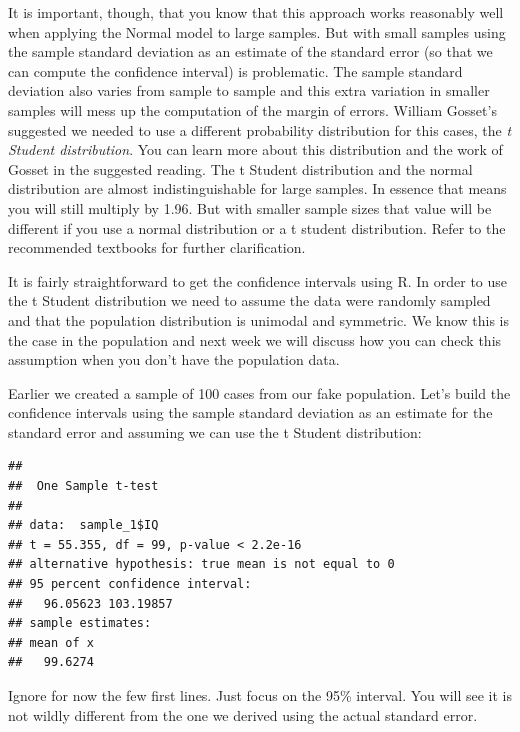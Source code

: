 \documentclass[]{book}
\newenvironment{Shaded}{\begin{snugshade}}{\end{snugshade}}
\newcommand{\DecValTok}[1]{\textcolor[rgb]{0.00,0.00,0.81}{#1}}
\newcommand{\KeywordTok}[1]{\textcolor[rgb]{0.13,0.29,0.53}{\textbf{#1}}}
\newcommand{\NormalTok}[1]{#1}
\newcommand{\OperatorTok}[1]{\textcolor[rgb]{0.81,0.36,0.00}{\textbf{#1}}}
\theoremstyle{definition}
\theoremstyle{definition}
\theoremstyle{definition}
\theoremstyle{remark}
\begin{document}
It is important, though, that you know that this approach works
reasonably well when applying the Normal model to large samples. But
with small samples using the sample standard deviation as an estimate of
the standard error (so that we can compute the confidence interval) is
problematic. The sample standard deviation also varies from sample to
sample and this extra variation in smaller samples will mess up the
computation of the margin of errors. William Gosset's suggested we
needed to use a different probability distribution for this cases, the
\emph{t Student distribution}. You can learn more about this
distribution and the work of Gosset in the suggested reading. The t
Student distribution and the normal distribution are almost
indistinguishable for large samples. In essence that means you will
still multiply by 1.96. But with smaller sample sizes that value will be
different if you use a normal distribution or a t student distribution.
Refer to the recommended textbooks for further clarification.

It is fairly straightforward to get the confidence intervals using R. In
order to use the t Student distribution we need to assume the data were
randomly sampled and that the population distribution is unimodal and
symmetric. We know this is the case in the population and next week we
will discuss how you can check this assumption when you don't have the
population data.

Earlier we created a sample of 100 cases from our fake population. Let's
build the confidence intervals using the sample standard deviation as an
estimate for the standard error and assuming we can use the t Student
distribution:

\begin{Shaded}
\end{Shaded}

\begin{verbatim}
## 
##  One Sample t-test
## 
## data:  sample_1$IQ
## t = 55.355, df = 99, p-value < 2.2e-16
## alternative hypothesis: true mean is not equal to 0
## 95 percent confidence interval:
##   96.05623 103.19857
## sample estimates:
## mean of x 
##   99.6274
\end{verbatim}

Ignore for now the few first lines. Just focus on the 95\% interval. You
will see it is not wildly different from the one we derived using the
actual standard error.
\end{document}

